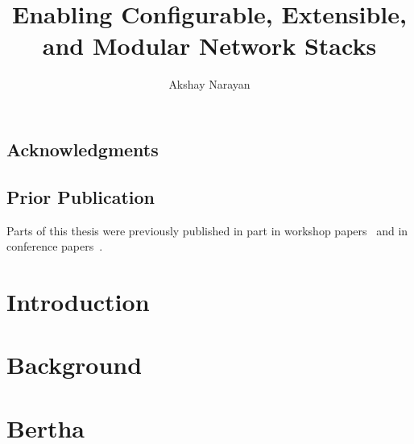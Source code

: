 \documentclass[fontsize=12pt,paper=letter,twosided,cleardoublepage=plain,final]{scrbook}
\title{Enabling Configurable, Extensible, and Modular Network Stacks}
\author{Akshay Narayan}
\begin{document}
\frontmatter



\cleardoublepage


\cleardoublepage

\section*{Acknowledgments}
\begin{spacing}{1}

\end{spacing}
\cleardoublepage

\section*{Prior Publication}
Parts of this thesis were previously published in part in workshop papers~\cite{ccp, bertha} and in conference
papers~\cite{ccp, bundler, park}.
\cleardoublepage

\tableofcontents

\mainmatter

\chapter{Introduction}\label{s:intro}



\chapter{Background}\label{s:background}


\chapter{Bertha}\label{s:bertha}







\end{document}
